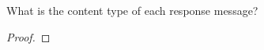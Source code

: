 \documentclass[../../main.tex]{subfiles}
\begin{document}
\begin{wts}
What is the content type of each response message?
\end{wts}
\begin{proof}

\end{proof}
\end{document}
